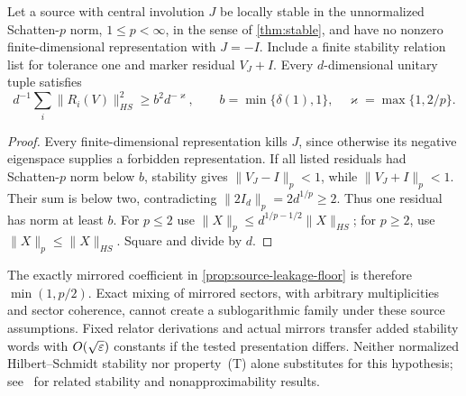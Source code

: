 \begin{proposition}\label{prop:stable-tracial-defect}
Let a source with central involution $J$ be locally stable in the unnormalized Schatten-$p$ norm, $1\le p<\infty$, in the sense of \cref{thm:stable}, and have no nonzero finite-dimensional representation with $J=-I$. Include a finite stability relation list for tolerance one and marker residual $V_J+I$. Every $d$-dimensional unitary tuple satisfies
\[
 d^{-1}\sum_i\|R_i(V)\|_{HS}^2\ge b^2d^{-\varkappa},\qquad
 b=\min\{\delta(1),1\},\quad\varkappa=\max\{1,2/p\}.
\]
\end{proposition}
\begin{proof}
Every finite-dimensional representation kills $J$, since otherwise its negative eigenspace supplies a forbidden representation. If all listed residuals had Schatten-$p$ norm below $b$, stability gives $\|V_J-I\|_p<1$, while $\|V_J+I\|_p<1$. Their sum is below two, contradicting $\|2I_d\|_p=2d^{1/p}\ge2$. Thus one residual has norm at least $b$. For $p\le2$ use $\|X\|_p\le d^{1/p-1/2}\|X\|_{HS}$; for $p\ge2$, use $\|X\|_p\le\|X\|_{HS}$. Square and divide by $d$.
\end{proof}

The exactly mirrored coefficient in \cref{prop:source-leakage-floor} is therefore $\min(1,p/2)$. Exact mixing of mirrored sectors, with arbitrary multiplicities and sector coherence, cannot create a sublogarithmic family under these source assumptions. Fixed relator derivations and actual mirrors transfer added stability words with $O(\sqrt{\varepsilon})$ constants if the tested presentation differs. Neither normalized Hilbert--Schmidt stability nor property~(T) alone substitutes for this hypothesis; see~\cite{DGLT20,LO20} for related stability and nonapproximability results.

